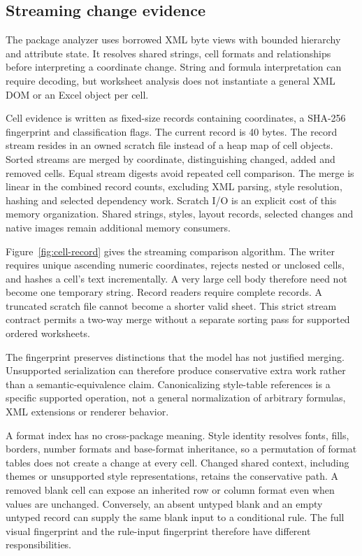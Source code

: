 \subsection{Streaming change evidence}
The package analyzer uses borrowed XML byte views with bounded hierarchy and
attribute state. It resolves shared strings, cell formats and relationships before
interpreting a coordinate change. String and formula interpretation can require
decoding, but worksheet analysis does not instantiate a general XML DOM or an
Excel object per cell.

Cell evidence is written as fixed-size records containing coordinates, a
SHA-256 fingerprint and classification flags. The current record is 40 bytes.
The record stream resides in an owned scratch file instead of a heap map of
cell objects. Sorted streams are merged by coordinate, distinguishing changed,
added and removed cells. Equal stream digests avoid repeated cell comparison.
The merge is linear in the combined record counts, excluding XML parsing,
style resolution, hashing and selected dependency work. Scratch I/O is an explicit
cost of this memory organization. Shared strings, styles, layout records,
selected changes and native images remain additional memory consumers.

Figure~\ref{fig:cell-record} gives the streaming comparison algorithm. The writer
requires unique ascending numeric coordinates, rejects nested or unclosed cells,
and hashes a cell's text incrementally. A very large cell body therefore need
not become one temporary string. Record readers require complete records. A
truncated scratch file cannot become a shorter valid sheet. This strict stream
contract permits a two-way merge without a separate sorting pass for supported
ordered worksheets.


The fingerprint preserves distinctions that the model has not justified merging.
Unsupported serialization can therefore produce conservative extra work rather
than a semantic-equivalence claim. Canonicalizing style-table references is a
specific supported operation, not a general normalization of arbitrary formulas,
XML extensions or renderer behavior.

A format index has no cross-package meaning. Style identity resolves fonts,
fills, borders, number formats and base-format inheritance, so a permutation
of format tables does not create a change at every cell. Changed shared context,
including themes or unsupported style representations, retains the conservative
path. A removed blank cell can expose an inherited row or column format even
when values are unchanged. Conversely, an absent untyped blank and an empty
untyped record can supply the same blank input to a conditional rule. The full
visual fingerprint and the rule-input fingerprint therefore have different
responsibilities.

